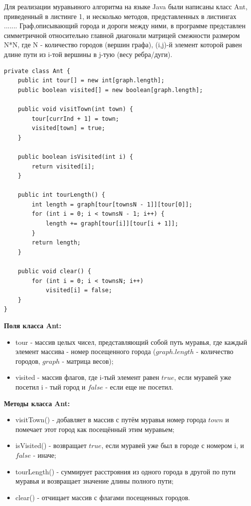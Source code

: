 \documentclass[a4paper,12pt]{article}
\begin{document}
Для реализации муравьиного алгоритма на языке Java были написаны класс Ant, приведенный в листинге 1, и несколько методов, представленных в листингах .......
Граф,описывающий города и дороги между ними, в программе представлен симметричной относительно главной диагонали матрицей смежности размером N*N, где N - количество городов (вершин графа), (i,j)-й элемент которой равен длине пути из i-той вершины в j-тую (весу ребра/дуги).
\begin{lstlisting}[label=some-code,caption=Класс Ant]
private class Ant {
    public int tour[] = new int[graph.length];
    public boolean visited[] = new boolean[graph.length];

    public void visitTown(int town) {
        tour[currInd + 1] = town;
        visited[town] = true;
    }

    public boolean isVisited(int i) {
        return visited[i];
    }

    public int tourLength() {
        int length = graph[tour[townsN - 1]][tour[0]];
        for (int i = 0; i < townsN - 1; i++) {
            length += graph[tour[i]][tour[i + 1]];
        }
        return length;
    }

    public void clear() {
        for (int i = 0; i < townsN; i++)
            visited[i] = false;
    }
}
\end{lstlisting}
{\bf Поля класса Ant:}
\begin{itemize}
    \item tour - массив целых чисел, представляющий собой путь муравья, где каждый элемент массива - номер посещенного города ($graph.length$ - количество городов, $graph$ - матрица весов);
    \item visited - массив флагов, где i-тый элемент равен $true$, если муравей уже посетил i - тый город и $false$ - если еще не посетил.
\end{itemize}
{\bf Методы класса Ant:}
\begin{itemize}
    \item visitTown() - добавляет в массив с путём муравья номер города $town$ и помечает этот город как посещённый этим муравьем;
    \item isVisited() - возвращает $true$, если муравей уже был в городе с номером i, и $false$ - иначе;
    \item tourLength() - суммирует расстрояния из одного города в другой по пути муравья и возвращает значение длины полного пути;
    \item clear() - отчищает массив с флагами посещенных городов.
\end{itemize}
\end{document}
